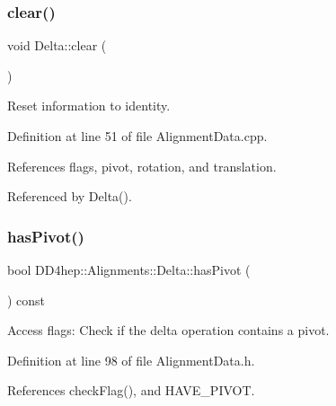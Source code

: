 \subsubsection{\texorpdfstring{clear()}{clear()}}
{\footnotesize\ttfamily void Delta\+::clear (\begin{DoxyParamCaption}{ }\end{DoxyParamCaption})}



Reset information to identity. 



Definition at line 51 of file Alignment\+Data.\+cpp.



References flags, pivot, rotation, and translation.



Referenced by Delta().

\hypertarget{class_d_d4hep_1_1_alignments_1_1_delta_aee773271175ba4865205f990852e7e4b}{}\label{class_d_d4hep_1_1_alignments_1_1_delta_aee773271175ba4865205f990852e7e4b} 
\subsubsection{\texorpdfstring{has\+Pivot()}{hasPivot()}}
{\footnotesize\ttfamily bool D\+D4hep\+::\+Alignments\+::\+Delta\+::has\+Pivot (\begin{DoxyParamCaption}{ }\end{DoxyParamCaption}) const\hspace{0.3cm}{\ttfamily [inline]}}



Access flags\+: Check if the delta operation contains a pivot. 



Definition at line 98 of file Alignment\+Data.\+h.



References check\+Flag(), and H\+A\+V\+E\+\_\+\+P\+I\+V\+OT.

\hypertarget{class_d_d4hep_1_1_alignments_1_1_delta_a6fc6a8378f6229e0e8d89be1c3663e77}{}\label{class_d_d4hep_1_1_alignments_1_1_delta_a6fc6a8378f6229e0e8d89be1c3663e77} 
